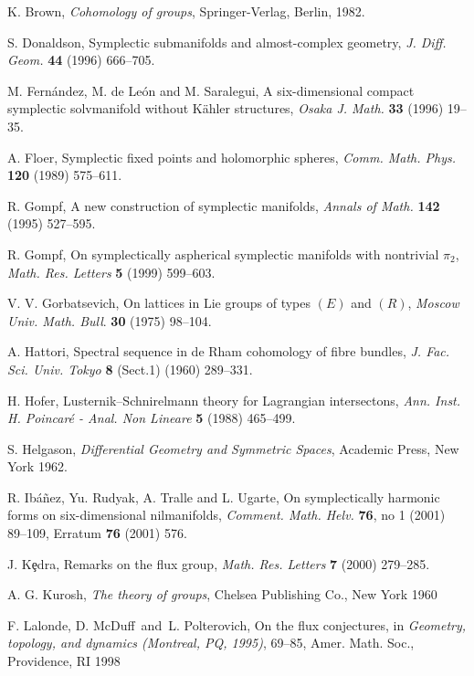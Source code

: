 \documentclass[12pt, twoside]{amsart}
\theoremstyle{plain}
\theoremstyle{definition}
\numberwithin{equation}{section}
\begin{document}
\begin{thebibliography}{[IRTU]}
          
K. Brown, {\it Cohomology of groups},
Springer-Verlag, Berlin, 1982.

S. Donaldson, Symplectic submanifolds and almost-complex geometry,
{\it J. Diff. Geom.}
{\bf 44} (1996) 666--705.

M. Fern\'andez, M. de Le\'on and M. Saralegui, A six-dimensional compact 
symplectic solvmanifold without K\"ahler
structures, 
{\it Osaka J. Math.}
{\bf  33}
(1996) 19--35.

A. Floer, Symplectic fixed points and holomorphic spheres,
{\it Comm. Math. Phys.}
{\bf  120}
(1989)
575--611.

R. Gompf, A new construction of symplectic manifolds, 
{\it Annals of Math.}
{\bf  142}
(1995) 
527--595.

R. Gompf, On symplectically aspherical symplectic manifolds with nontrivial 
$\pi_2$,
{\it Math. Res. Letters}
{\bf  5}
(1999) 
599--603.

V. V. Gorbatsevich, On lattices in Lie groups of types $(E)$ and $(R)$, 
{\it Moscow Univ. Math. Bull}.
{\bf 30} (1975) 98--104.

A. Hattori, Spectral sequence in de Rham cohomology of fibre bundles,
{\it J. Fac. Sci. Univ. Tokyo}
{\bf  8}  (Sect.1) (1960)  289--331.


H. Hofer, Lusternik--Schnirelmann theory for Lagrangian intersectons,
{\it Ann. Inst. H. Poincar\'e - Anal. Non Lineare}
{\bf 5} (1988)  465--499.

S. Helgason,
{\it Differential Geometry and Symmetric Spaces},
Academic Press, New York 1962.

R. Ib\'a\~nez, Yu. Rudyak, A. Tralle and L. Ugarte, On symplectically harmonic 
forms on six-dimensional nilmanifolds,
{\it Comment. Math. Helv.} {\bf  76}, no 1 (2001) 89--109, Erratum {\bf 76} 
(2001) 576.

J. K\c edra, Remarks on the flux group,
{\it Math. Res. Letters}
{\bf  7} (2000) 279--285.

A. G. Kurosh, {\it The theory of groups}, Chelsea
Publishing Co., New York 1960

F. Lalonde, D. McDuff\ and\ L. Polterovich, On the flux conjectures, 
in
{\it Geometry, topology, and dynamics {\rm (}Montreal, PQ, 1995{\rm )}}, 69--85, 
Amer. Math. Soc., Providence, RI 1998


\end{thebibliography}
\end{document}
